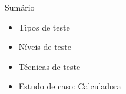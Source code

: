 
\begin{frame}{Sumário}
    \begin{itemize}
        \item Tipos de teste
        \item Níveis de teste
        \item Técnicas de teste
        \item Estudo de caso: Calculadora
    \end{itemize}
\end{frame}